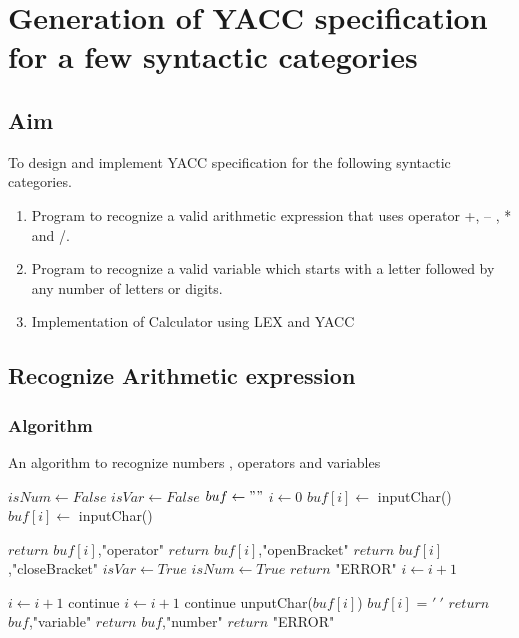 \clearpage
\chapter{Generation of YACC specification for a few syntactic categories}

\section{Aim}
To design and implement YACC specification for the following syntactic categories.
\begin{enumerate}
	\item Program to recognize a valid arithmetic expression that uses operator +, – , * and /.
	\item Program to recognize a valid variable which starts with a letter followed by any	number of letters or digits.
	\item Implementation of Calculator using LEX and YACC
\end{enumerate}


\section{Recognize Arithmetic expression}
\subsection{Algorithm}
\begin{algorithm}[H]
	\caption{An algorithm to recognize numbers , operators and variables}
	\begin{algorithmic}[1]
		\State $isNum \gets False$
		\State $isVar \gets False$
		\State $buf \gets ""$
		\State $i \gets 0$
		\State $buf[i] \gets $ inputChar()
		\State $buf[i] \gets $ inputChar()
		\EndWhile
		
		\State $return$ $buf[i]$,"operator"
		\State $return$ $buf[i]$,"openBracket"
		\State $return$ $buf[i]$,"closeBracket"
		\State $isVar \gets True$
		\State $isNum \gets True$
		\Else
		\State $return$ "ERROR"
		\EndIf
		\State $i \gets i+1$
		
		\State $i \gets i + 1$
		\State continue
		\State $i \gets i + 1$
		\State continue
		\Else
		\State unputChar($buf[i]$) 
		\State $buf[i]$ = $'\ '$
		\State $return$ $buf$,"variable"
		\State $return$ $buf$,"number"
		\Else
		\State $return$ "ERROR"
		\EndIf
		\EndIf
		\EndWhile
	\end{algorithmic}
\end{algorithm}

